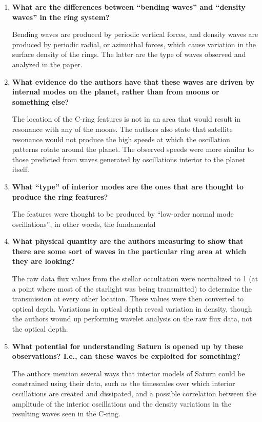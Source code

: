 \documentclass[11pt]{article}
\begin{document}
\begin{enumerate}
    \item \textbf{What are the differences between ``bending waves'' and
    ``density waves'' in the ring system?}

    Bending waves are produced by periodic vertical forces, and
    density waves are produced by periodic radial, or azimuthal
    forces, which cause variation in the surface density of the rings.
    The latter are the type of waves observed and analyzed in the paper.

    \item \textbf{What evidence do the authors have that these waves are
    driven by internal modes on the planet, rather than from moons
    or something else?}

    The location of the C-ring features is not in an area
    that would result in resonance with any of the moons. The authors
    also state that satellite resonance would not produce the high
    speeds at which the oscillation patterns rotate around the planet.
    The observed speeds were more similar to those
    predicted from waves generated by oscillations interior to the
    planet itself.

    \item \textbf{What ``type'' of interior modes are the ones that are thought
    to produce the ring features?}

    The features were thought to be produced by ``low-order normal
    mode oscillations'', in other words, the fundamental  

    \item \textbf{What physical quantity are the authors measuring to show
    that there are some sort of waves in the particular ring area
    at which they are looking?}

    The raw data flux values from the stellar occultation
    were normalized to 1 (at a point where most of the starlight
    was being transmitted) to determine the transmission at every
    other location. These values were then converted to optical depth.
    Variations in optical depth reveal variation in density, though
    the authors wound up performing wavelet analysis on the raw flux
    data, not the optical depth.

    \item \textbf{What potential for understanding Saturn is opened up by
    these observations? I.e., can these waves be exploited for something?}

    The authors mention several ways that interior models of Saturn
    could be constrained using their data, such as the timescales over
    which interior oscillations are created and dissipated, and a
    possible correlation between the amplitude of the interior
    oscillations and the density variations in the resulting waves
    seen in the C-ring.


\end{enumerate}
\end{document}
